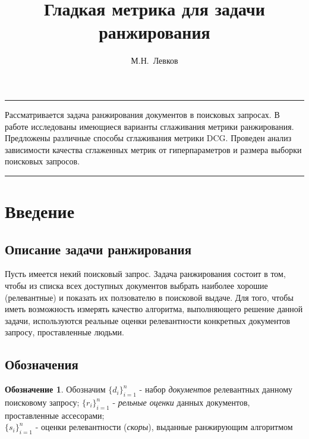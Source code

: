 \documentclass[14pt,a4paper]{amsart}
\theoremstyle{definition}
\theoremstyle{definition}
\newtheorem{designation}{Обозначение}[section]
\renewenvironment{abstract}{%
\hfill\begin{minipage}{0.95\textwidth}
\rule{\textwidth}{1pt}}
{\par\noindent\rule{\textwidth}{1pt}\end{minipage}}
\renewcommand\i{\textit}
\begin{document}

\title{Гладкая метрика для задачи ранжирования}

\author{М.Н.~Левков}

\maketitle

\begin{abstract}
\normalsize
Рассматривается задача ранжирования документов в поисковых запросах. В работе исследованы имеющиеся варианты сглаживания метрики ранжирования. Предложены различные способы сглаживания метрики DCG. Проведен анализ зависимости качества сглаженных метрик от гиперпараметров и размера выборки поисковых запросов.
\end{abstract}




\tableofcontents

\pagebreak


\section{Введение}

\subsection{Описание задачи ранжирования}
Пусть имеется некий поисковый запрос. Задача ранжирования состоит в том, чтобы из списка всех доступных документов выбрать наиболее хорошие (релевантные) и показать их ползователю в поисковой выдаче. Для того, чтобы иметь возможность измерять качество алгоритма, выполняющего решение данной задачи, используются реальные оценки релевантности конкретных документов запросу, проставленные людьми.

\subsection{Обозначения}
\begin{designation}
Обозначим $\{d_i\}_{i=1}^n$ - набор \i{документов} релевантных данному поисковому запросу; 
$\{r_i\}_{i=1}^n$ - \i{рельные оценки} данных документов, проставленные ассесорами; \\
$\{s_i\}_{i=1}^n$ - оценки релевантности (\i{скоры}), выданные ранжирующим алгоритмом
\end{designation}
\end{document}

